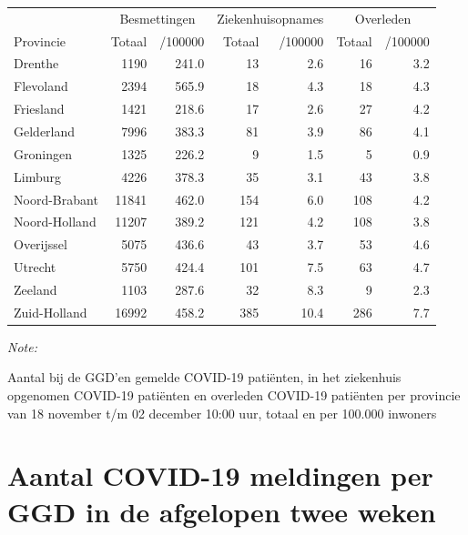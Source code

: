 \documentclass[
  english,
  man,floatsintext]{apa6}
\begin{document}
\begin{table}[H]
\centering
\begin{threeparttable}
\begin{tabular}{lrrrrrr}
\toprule
\multicolumn{1}{c}{ } & \multicolumn{2}{c}{Besmettingen} & \multicolumn{2}{c}{Ziekenhuisopnames} & \multicolumn{2}{c}{Overleden} \\
\cmidrule(l{3pt}r{3pt}){2-3} \cmidrule(l{3pt}r{3pt}){4-5} \cmidrule(l{3pt}r{3pt}){6-7}
Provincie & Totaal & /100000 & Totaal & /100000 & Totaal & /100000\\
\midrule
Drenthe & 1190 & 241.0 & 13 & 2.6 & 16 & 3.2\\
Flevoland & 2394 & 565.9 & 18 & 4.3 & 18 & 4.3\\
Friesland & 1421 & 218.6 & 17 & 2.6 & 27 & 4.2\\
Gelderland & 7996 & 383.3 & 81 & 3.9 & 86 & 4.1\\
Groningen & 1325 & 226.2 & 9 & 1.5 & 5 & 0.9\\
Limburg & 4226 & 378.3 & 35 & 3.1 & 43 & 3.8\\
Noord-Brabant & 11841 & 462.0 & 154 & 6.0 & 108 & 4.2\\
Noord-Holland & 11207 & 389.2 & 121 & 4.2 & 108 & 3.8\\
Overijssel & 5075 & 436.6 & 43 & 3.7 & 53 & 4.6\\
Utrecht & 5750 & 424.4 & 101 & 7.5 & 63 & 4.7\\
Zeeland & 1103 & 287.6 & 32 & 8.3 & 9 & 2.3\\
Zuid-Holland & 16992 & 458.2 & 385 & 10.4 & 286 & 7.7\\
\bottomrule
\end{tabular}
\begin{tablenotes}
\item \textit{Note: } 
\item Aantal bij de GGD’en gemelde COVID-19 patiënten, in het ziekenhuis opgenomen COVID-19 patiënten en overleden COVID-19 patiënten per provincie van 18 november t/m 02 december 10:00 uur, totaal en per 100.000 inwoners
\end{tablenotes}
\end{threeparttable}
\end{table}

\newpage

\hypertarget{aantal-covid-19-meldingen-per-ggd-in-de-afgelopen-twee-weken}{%
\section{Aantal COVID-19 meldingen per GGD in de afgelopen twee weken}\label{aantal-covid-19-meldingen-per-ggd-in-de-afgelopen-twee-weken}}
\end{document}
